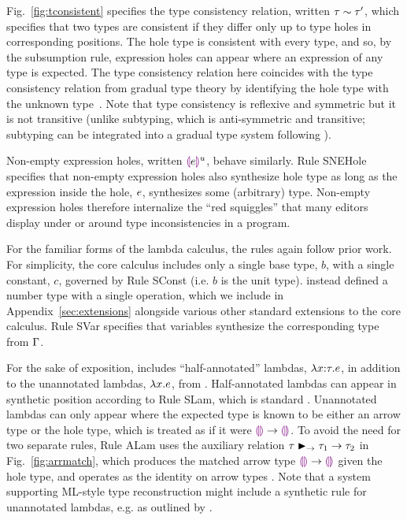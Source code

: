 


Fig.~\ref{fig:tconsistent} specifies the type consistency relation, written $\tau \sim \tau'$, which specifies that two types are consistent if they differ only up to type holes in corresponding positions. The hole type is consistent with every type, and so, by the subsumption rule, expression holes can appear where an expression of any type is expected. The type consistency relation here coincides with the type consistency relation from gradual type theory by identifying the hole type with the unknown type~\cite{Siek06a}. Note that type consistency is reflexive and symmetric but it is not transitive (unlike subtyping, which is anti-symmetric and transitive; subtyping can be integrated into a gradual type system following \citet{Siek:2007qy}). 

Non-empty expression holes, written $\textcolor{violet}{\llparenthesis}e\textcolor{violet}{\rrparenthesis}^{u}$, behave similarly. Rule {SNEHole} specifies that non-empty expression holes also synthesize hole type as long as the expression inside the hole, $e$, synthesizes some (arbitrary) type. Non-empty expression holes therefore internalize the ``red squiggles'' that many editors display under or around type inconsistencies in a program.

For the familiar forms of the lambda calculus, the rules again follow prior work. For simplicity, the core calculus includes only a single base type, $b$, with a single constant, $c$, governed by Rule {SConst} (i.e. $b$ is the unit type). \Hazelnut instead defined a number type with a single operation, which we include in Appendix~\ref{sec:extensions} alongside various other standard extensions to the core calculus. 
%
%
Rule {SVar} specifies that variables synthesize the corresponding type from $\Gamma$. 

For the sake of exposition, \HazelnutLive includes ``half-annotated'' lambdas, $\lambda x{:}\tau.e$, in addition to the unannotated lambdas, $\lambda x.e$, from \Hazelnut.  Half-annotated lambdas can appear in synthetic position  according to Rule {SLam}, which is standard \cite{Chlipala:2005da}. Unannotated lambdas can only appear where the expected type is known to be either an arrow type or the hole type, which is treated as if it were $\textcolor{violet}{\llparenthesis}\textcolor{violet}{\rrparenthesis} \rightarrow \textcolor{violet}{\llparenthesis}\textcolor{violet}{\rrparenthesis}$. To avoid the need for two separate rules, Rule {ALam} uses the auxiliary relation $\tau \blacktriangleright_{\rightarrow} \tau_1 \rightarrow \tau_2$ in Fig.~\ref{fig:arrmatch}, which produces the matched arrow type $\textcolor{violet}{\llparenthesis}\textcolor{violet}{\rrparenthesis} \rightarrow \textcolor{violet}{\llparenthesis}\textcolor{violet}{\rrparenthesis}$ given the hole type, and operates as the identity on arrow types \cite{DBLP:conf/snapl/SiekVCB15,DBLP:conf/popl/GarciaC15}. Note that a system supporting ML-style type reconstruction \cite{damas1982principal} might include a synthetic rule for unannotated lambdas, e.g. as outlined by \citet{DBLP:conf/icfp/DunfieldK13}. 

